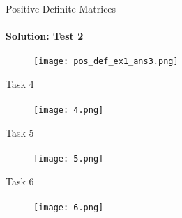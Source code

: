 \documentclass[aspectratio=169]{beamer}
\begin{document}
        \begin{frame}[t]{Positive Definite Matrices}
            \framesubtitle{Solution: Test 2}
            \begin{figure}[H]
                \centering\texttt{[image: pos\_def\_ex1\_ans3.png]}
                \label{fig:pos_def_ex1_ans3.png}
            \end{figure}
            \end{frame}

\begin{frame}[t]{Task 4}
    \framesubtitle{}
    \vspace{-0.5cm}
    \begin{figure}[H]
        \centering\texttt{[image: 4.png]}
        \label{fig:4.png}
    \end{figure}
\end{frame}

\begin{frame}[t]{Task 5}
    \framesubtitle{}
    \vspace{-0.5cm}
    \begin{figure}[H]
        \centering\texttt{[image: 5.png]}
        \label{fig:5.png}
    \end{figure}
\end{frame}

\begin{frame}[t]{Task 6}
    \framesubtitle{}
    \vspace{-0.5cm}
    \begin{figure}[H]
        \centering\texttt{[image: 6.png]}
        \label{fig:6.png}
    \end{figure}
\end{frame}
\end{document}
